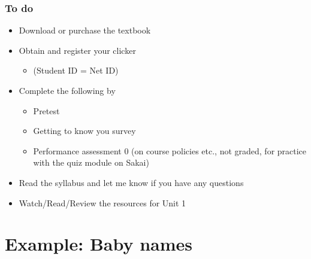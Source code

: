 \documentclass[slidestop,compress,mathserif,12pt,t,professionalfonts,xcolor=table]{beamer}
\begin{document}
\begin{frame}
\frametitle{To do}

\begin{itemize}

\item Download or purchase the textbook

\item Obtain and register your clicker
\begin{itemize}
\item {} (Student ID = Net ID)
\end{itemize}

\item Complete the following by \GettingToKnowYouDD{}
\begin{itemize}
\item Pretest
\item Getting to know you survey
\item Performance assessment 0 (on course policies etc., not graded, for practice with the quiz module on Sakai)
\end{itemize}

\item Read the syllabus and let me know if you have any questions

\item Watch/Read/Review the resources for Unit 1

\end{itemize}


\end{frame}


\section{Example: Baby names}

\end{document}

